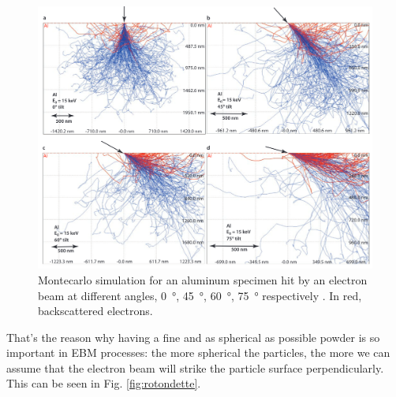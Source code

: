 \begin{figure}
    \centering
    \includegraphics[scale=0.4]{Images/backscattering.png}
    \caption[Backscattering of an electron at different angles.]{Montecarlo simulation for an aluminum specimen hit by an electron beam at different angles, \SI{0}{\degree}, \SI{45}{\degree}, \SI{60}{\degree}, \SI{75}{\degree} respectively \cite{goldstein_scanning_2018}. In red, backscattered electrons.}
    \label{fig:backscattering}
\end{figure}
That's the reason why having a fine and as spherical as possible powder is so important in EBM processes: the more spherical the particles, the more we can assume that the electron beam will strike the particle surface perpendicularly. This can be seen in Fig. \ref{fig:rotondette}.
